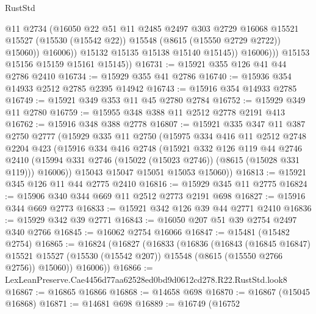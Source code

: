 \begin{lexlean}{RustStd}
\begin{coremodule}
                        @11
                        @2734
                        (@16050
                          @22
                          @51
                          @11
                          @2485
                          @2497
                          @303
                          @2729
                          @16068
                          @15521
                          @15527
                          (@15530 (@15542 @22))
                          @15548
                          (@8615 (@15550 @2729 @2722))
                          @15060))
                      @16006))
                  @15132
                  @15135
                  @15138
                  @15140
                  @15145))
              @16006)))
        @15153
        @15156
        @15159
        @15161
        @15145))
@16731 := @15921 @355 @126 @41 @44 @2786 @2410
@16734 := @15929 @355 @41 @2786
@16740 := @15936 @354 @14933 @2512 @2785 @2395 @14942
@16743 := @15916 @354 @14933 @2785
@16749 := @15921 @349 @353 @11 @45 @2780 @2784
@16752 := @15929 @349 @11 @2780
@16759 := @15955 @348 @388 @11 @2512 @2778 @2191 @413
@16762 := @15916 @348 @388 @2778
@16807 := @15921
    @335
    @347
    @11
    @387
    @2750
    @2777
    (@15929
      @335
      @11
      @2750
      (@15975
        @334
        @416
        @11
        @2512
        @2748
        @2204
        @423
        (@15916
          @334
          @416
          @2748
          (@15921
            @332
            @126
            @119
            @44
            @2746
            @2410
            (@15994 @331 @2746 (@15022 (@15023 @2746)) (@8615 (@15028 @331 @119)))
            @16006))
        @15043
        @15047
        @15051
        @15053
        @15060))
@16813 := @15921 @345 @126 @11 @44 @2775 @2410
@16816 := @15929 @345 @11 @2775
@16824 := @15906 @340 @344 @669 @11 @2512 @2773 @2191 @698
@16827 := @15916 @344 @669 @2773
@16833 := @15921 @342 @126 @39 @44 @2771 @2410
@16836 := @15929 @342 @39 @2771
@16843 := @16050 @207 @51 @39 @2754 @2497 @340 @2766
@16845 := @16062 @2754 @16066
@16847 := @15481 (@15482 @2754)
@16865 := @16824
    (@16827
      (@16833
        (@16836
          (@16843
            (@16845 @16847)
            @15521
            @15527
            (@15530 (@15542 @207))
            @15548
            (@8615 (@15550 @2766 @2756))
            @15060))
        @16006))
@16866 := LexLeanPreserve.Cae4456d77aa62528ed0bd9d0612cd278.R22.RustStd.look8
@16867 := @16865 @16866
@16868 := @14658 @698
@16870 := @16867 (@15045 @16868)
@16871 := @14681 @698
@16889 := @16749
    (@16752

\end{coremodule}
\end{lexlean}

